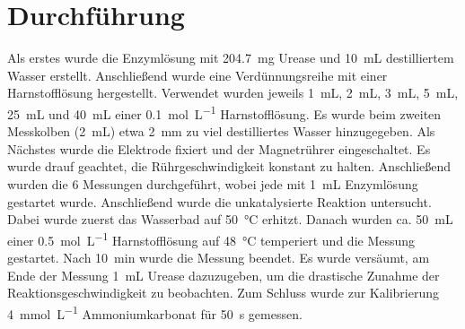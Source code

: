 \section{Durchführung} 
Als erstes wurde die Enzymlösung mit \qty{204,7}{\milli\gram} Urease und \qty{10}{\milli\liter} destilliertem Wasser erstellt. 
Anschließend wurde eine  Verdünnungsreihe mit einer Harnstofflösung hergestellt. 
Verwendet wurden jeweils \qty{1}{\milli\liter}, \qty{2}{\milli\liter}, \qty{3}{\milli\liter}, \qty{5}{\milli\liter}, \qty{25}{\milli\liter} und \qty{40}{\milli\liter} einer \qty{0,1}{\mole\per\liter} Harnstofflösung. 
Es wurde beim zweiten Messkolben (\qty{2}{\milli\liter}) etwa \qty{2}{\milli\meter} zu viel destilliertes Wasser hinzugegeben. 
Als Nächstes wurde die Elektrode fixiert und der Magnetrührer eingeschaltet. 
Es wurde drauf geachtet, die Rührgeschwindigkeit konstant zu halten. 
Anschließend wurden die 6 Messungen durchgeführt, wobei jede mit \qty{1}{\milli\liter} Enzymlösung gestartet wurde. 
Anschließend wurde die unkatalysierte Reaktion untersucht. 
Dabei wurde zuerst das Wasserbad auf \qty{50}{\degreeCelsius} erhitzt. Danach wurden ca. \qty{50}{\milli\liter} einer \qty{0,5}{\mole\per\liter} Harnstofflösung auf \qty{48}{\degreeCelsius} temperiert und die  Messung gestartet. 
Nach \qty{10}{min} wurde die Messung beendet. 
Es wurde versäumt, am Ende der Messung \qty{1}{\milli\liter} Urease dazuzugeben, um die drastische Zunahme der Reaktionsgeschwindigkeit zu beobachten. 
Zum Schluss wurde zur Kalibrierung \qty{4}{\milli\mole\per\liter} Ammoniumkarbonat für \qty{50}{\second} gemessen.
